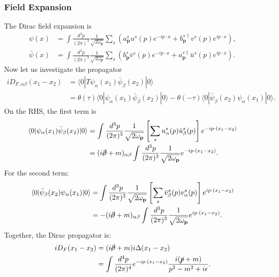 \subsubsection*{Field Expansion}
The Dirac field expansion is
\begin{equation}
\begin{aligned}
	\psi(x) &=\int \frac{d^{3} p}{(2 \pi)^{3}} \frac{1}{\sqrt{2 \omega_{\mathbf{p}}}} 
		\sum_{s}\left(a_{\mathbf{p}}^{s} u^{s}(p) e^{-i p \cdot x}
		+b_{\mathbf{p}}^{s \dagger} v^{s}(p) e^{i p \cdot x}\right), \\
	\bar{\psi}(x) &=\int \frac{d^{3} p}{(2 \pi)^{3}} \frac{1}{\sqrt{2 \omega_{\mathbf{p}}}} 
		\sum_{s}\left(b_{\mathbf{p}}^{s} \bar{v}^{s}(p) e^{-i p \cdot x}
		+a_{\mathbf{p}}^{s \dagger} \bar{u}^{s}(p) e^{i p \cdot x}\right).
\end{aligned}
\end{equation}
Now let us investigate the propagator
\begin{equation}
\begin{aligned}
	iD_{F,\alpha\beta}(x_1-x_2) &= \langle0|T\psi_\alpha(x_1)\bar\psi_\beta(x_2)|0\rangle \\
	&= \theta(\tau) \langle0|\psi_\alpha(x_1)\bar\psi_\beta(x_2)|0\rangle - \theta(-\tau) \langle0|\bar\psi_\beta(x_2)\psi_\alpha(x_1)|0\rangle.
\end{aligned}
\end{equation}
On the RHS, the first term is
\begin{equation*}
\begin{aligned}
	\langle0|\psi_\alpha(x_1)\bar\psi_\beta(x_2)|0\rangle 
	&= \int \frac{d^{3} p}{(2 \pi)^{3}} \frac{1}{\sqrt{2 \omega_{\mathbf{p}}}} \left[\sum_s u_\alpha^s(p)\bar u_\beta^s(p)\right]e^{-i p\cdot (x_1-x_2)} \\
	&= (i\cancel \partial+m)_{\alpha\beta}\int \frac{d^{3} p}{(2 \pi)^{3}} \frac{1}{\sqrt{2 \omega_{\mathbf{p}}}} e^{-i p\cdot (x_1-x_2)}.
\end{aligned}
\end{equation*}
For the second term:
\begin{equation*}
\begin{aligned}
	\langle0|\bar\psi_\beta(x_2)\psi_\alpha(x_1)|0\rangle
	&= \int \frac{d^{3} p}{(2 \pi)^{3}} \frac{1}{\sqrt{2 \omega_{\mathbf{p}}}} \left[\sum_s \bar v_\beta^s(p)v_\alpha^s(p)\right]e^{i p\cdot (x_1-x_2)} \\
	&= -(i\cancel \partial + m)_{\alpha\beta}\int \frac{d^{3} p}{(2 \pi)^{3}} \frac{1}{\sqrt{2 \omega_{\mathbf{p}}}} e^{i p\cdot (x_1-x_2)}.
\end{aligned}
\end{equation*}
Together, the Dirac propagator is:
\begin{equation}
\begin{aligned}
	iD_F(x_1-x_2) &= (i\cancel \partial+m)i\Delta(x_1-x_2) \\
	&= \int\frac{d^{4} p}{(2\pi)^{4}} e^{-i p\cdot (x_1-x_2)}\frac{i(\cancel p+m)}{p^2-m^2+i\epsilon}.
\end{aligned}
\end{equation}




